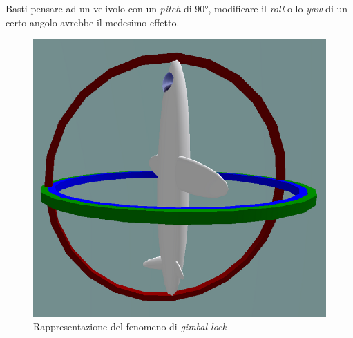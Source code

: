 Basti pensare ad un velivolo con un \textit{pitch} di $90°$, modificare il \textit{roll} o lo \textit{yaw} di un certo angolo avrebbe il medesimo effetto.\\
\begin{figure}[H]  
	\centering 
	\includegraphics[scale=0.3]{elaborazione/gimbal.png}
	\caption{Rappresentazione del fenomeno di \textit{gimbal lock} \cite{gimbal}}
	\label{fig:gimbal}
\end{figure}



